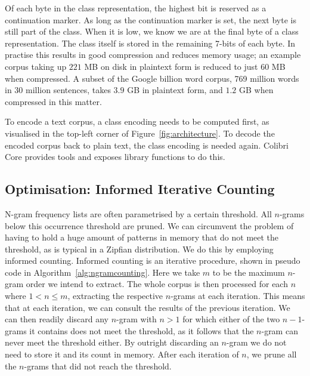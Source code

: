 Of each byte in the class representation, the highest bit is reserved as a continuation
marker. As long as the continuation marker is set, the next byte is still part of
the class. When it is low, we know we are at the final byte of a class
representation. The class itself is stored in the remaining 7-bits of each
byte. In practise this results in good compression and reduces memory usage; an
example corpus taking up $221$ MB on disk in plaintext form is reduced to just $60$ MB
when compressed. A subset of the Google billion word corpus, 769 million words
in 30 million sentences, takes $3.9$ GB in plaintext form, and $1.2$ GB when
compressed in this matter.

To encode a text corpus, a class encoding needs to be computed first, as
visualised in the top-left corner of Figure~\ref{fig:architecture}. To decode
the encoded corpus back to plain text, the class encoding is needed again.
Colibri Core provides tools and exposes library functions to do this.

\subsection*{Optimisation: Informed Iterative Counting}
\label{sec:iterativecounting}

N-gram frequency lists are often parametrised by a certain threshold. All
$n$-grams below this occurrence threshold are pruned. We can circumvent the
problem of having to hold a huge amount of patterns in memory that do not meet
the threshold, as is typical in a Zipfian distribution. We do this by employing
informed counting. Informed counting is an iterative procedure, shown in pseudo
code in Algorithm~\ref{alg:ngramcounting}. Here we take $m$ to be the maximum
$n$-gram order we intend to extract. The whole corpus is then processed for
each $n$ where $1<n\leq m$, extracting the respective $n$-grams at each
iteration. This means that at each iteration, we can consult the results of the
previous iteration. We can then readily discard any $n$-gram with $n>1$ for
which either of the two $n-1$-grams it contains does not
meet the threshold, as it follows that the $n$-gram can never meet the
threshold either. By outright discarding an $n$-gram we do not need to store it
and its count in memory. After each iteration of $n$, we prune all the
$n$-grams that did not reach the threshold.


